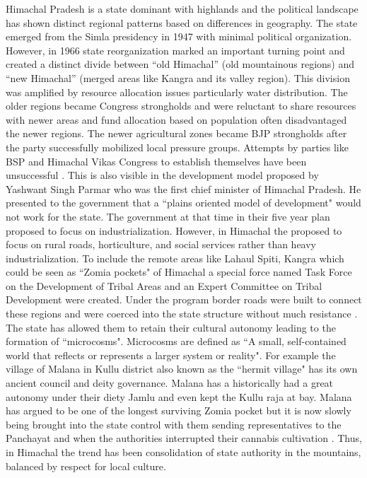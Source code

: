  Himachal Pradesh is a state dominant with highlands and the political landscape has shown distinct regional patterns based on differences in geography. The state emerged from the Simla presidency in 1947 with minimal political organization. However, in 1966 state reorganization marked an important turning point and created a distinct divide between \enquote{old Himachal} (old mountainous regions) and \enquote{new Himachal} (merged areas like Kangra and its valley region)\citep{TR_Sharma_1987}. This division was amplified by resource allocation issues particularly water distribution. The older regions became Congress strongholds and were reluctant to share resources with newer areas and fund allocation based on population often disadvantaged the newer regions. The newer agricultural zones became BJP strongholds after the party successfully mobilized local pressure groups. Attempts by parties like BSP and Himachal Vikas Congress to establish themselves have been unsuccessful \citep{chauhan2004bipolar}. This is also visible in the development model proposed by Yashwant Singh Parmar who was the first chief minister of Himachal Pradesh. He presented to the  government that a ``plains oriented model of development" would not work for the state. The  government at that time in their five year plan proposed to  focus on industrialization. However, in Himachal the proposed to focus on rural roads, horticulture, and social services rather than heavy industrialization. To include the remote areas like Lahaul Spiti, Kangra which could be seen as ``Zomia pockets" of Himachal a special force named Task Force on the Development of Tribal Areas and an Expert Committee on Tribal Development were created. Under the program border roads were built to connect these regions and were coerced into the state structure without much resistance \citep{StateEffectiveness2020}. The state has allowed them to retain their cultural autonomy leading to the formation of ``microcosms". Microcosms are defined as ``A small, self-contained world that reflects or represents a larger system or reality". For example the village of Malana in Kullu district also known as the ``hermit village" has its own ancient council and deity governance. Malana has a historically had a great autonomy under their diety Jamlu and even kept the Kullu raja at bay. Malana has argued to be one of the longest surviving Zomia pocket but it is now slowly being brought into the state control with them sending representatives to the Panchayat and when the authorities interrupted their cannabis cultivation \citep{axelby2015hermit}. Thus, in Himachal the trend has been consolidation of state authority in the mountains, balanced by respect for local culture.

